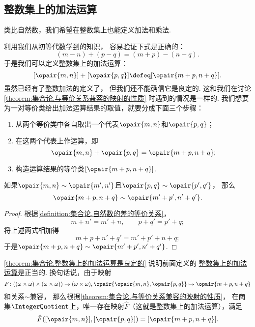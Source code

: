 \subsection{整数集上的加法运算}
类比自然数，我们希望在整数集上也能定义加法和乘法.

利用我们从初等代数学到的知识，
容易验证下式是正确的：\begin{equation*}
	(m-n)+(p-q) = (m+p)-(n+q).
\end{equation*}
于是我们可以定义整数集上的加法运算：
\begin{equation}\label{equation:集合论.整数集上的加法运算}
	[\opair{m,n}] + [\opair{p,q}]
	\defeq
	[\opair{m+p,n+q}].
\end{equation}
虽然已经有了整数加法的定义了，
但我们还不能确信它是良定的.
这和我们在讨论\cref{theorem:集合论.与等价关系兼容的映射的性质} 时遇到的情况是一样的.
我们想要为一对等价类给出加法运算结果的取值，就要分成下面三个步骤：
\begin{enumerate}
	\item 从两个等价类中各自取出一个代表\(\opair{m,n}\)和\(\opair{p,q}\)；
	\item 在这两个代表上作运算，即\begin{equation*}
		\opair{m,n} + \opair{p,q}
		= \opair{m+p,n+q};
	\end{equation*}
	\item 构造运算结果的等价类\([\opair{m+p,n+q}]\).
\end{enumerate}

\begin{lemma}\label{theorem:集合论.整数集上的加法运算是良定的}
如果\(\opair{m,n}\sim\opair{m',n'}\)且\(\opair{p,q}\sim\opair{p',q'}\)，
那么\begin{equation*}
	\opair{m+p,n+q}\sim\opair{m'+p',n'+q'}.
\end{equation*}
\begin{proof}
根据\cref{definition:集合论.自然数的差的等价关系}，
\begin{equation*}
	m+n'=m'+n, \qquad
	p+q'=p'+q;
\end{equation*}
将上述两式相加得\begin{equation*}
	m+p+n'+q'=m'+p'+n+q;
\end{equation*}
于是\(\opair{m+p,n+q}\sim\opair{m'+p',n'+q'}\).
\end{proof}
\end{lemma}
\cref{theorem:集合论.整数集上的加法运算是良定的} 说明前面定义的%
\hyperref[equation:集合论.整数集上的加法运算]{整数集上的加法运算}是正当的.
换句话说，由于映射\begin{equation*}
	F\colon ((\omega\times\omega)\times(\omega\times\omega))\to(\omega\times\omega),
	\opair{\opair{m,n},\opair{p,q}} \mapsto \opair{m+p,n+q}
\end{equation*}和关系\(\sim\)兼容，
那么根据\cref{theorem:集合论.与等价关系兼容的映射的性质}，
在商集\(\IntegerQuotient\)上，唯一存在映射\(\hat{F}\)（这就是整数集上的加法运算），满足\begin{equation*}
	\hat{F}([\opair{m,n}],[\opair{p,q}]) = [\opair{m+p,n+q}].
\end{equation*}

